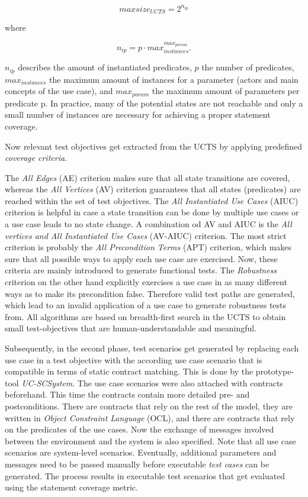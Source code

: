 \begin{equation}
	maxsize_{UCTS} = 2^{n_{ip}}
\end{equation}

where

\begin{equation}
	n_{ip} = p \cdot max_{instances}^{max_{param}}.
\end{equation}

$n_{ip}$ describes the amount of instantiated predicates, $p$ the number of predicates, $max_{instances}$ the maximum amount of instances for a parameter (actors and main concepts of the use case), and $max_{param}$ the maximum amount of parameters per predicate p. In practice, many of the potential states are not reachable and only a small number of instances are necessary for achieving a proper statement coverage. 

Now relevant test objectives get extracted from the UCTS by applying predefined \textit{coverage criteria}. 

The \textit{All Edges} (AE) criterion makes sure that all state transitions are covered, whereas the \textit{All Vertices} (AV) criterion guarantees that all states (predicates) are reached within the set of test objectives.  The \textit{All Instantiated Use Cases} (AIUC) criterion is helpful in case a state transition can be done by multiple use cases or a use case leads to no state change. A combination od AV and AIUC is the \textit{All vertices and All Instantiated Use Cases} (AV-AIUC) criterion. The most strict criterion is probably the \textit{All Precondition Terms} (APT) criterion, which makes sure that all possible ways to apply each use case are exercised. Now, these criteria are mainly introduced to generate functional tests. The \textit{Robustness} criterion on the other hand explicitly exercises a use case in as many different ways as to make its precondition false. Therefore valid test paths are generated, which lead to an invalid application of a use case to generate robustness tests from. All algorithms are based on breadth-first search in the UCTS to obtain small test-objectives that are human-understandable and meaningful. 

\newpage 

Subsequently, in the second phase, test scenarios get generated by replacing each use case in a test objective with the according use case scenario that is compatible in terms of static contract matching. This is done by the prototype-tool \textit{UC-SCSystem}. The use case scenarios were also attached with contracts beforehand. This time the contracts contain more detailed pre- and postconditions. There are contracts that rely on the rest of the model, they are written in \textit{Object Constraint Language} (OCL), and there are contracts that rely on the predicates of the use cases. Now the exchange of messages involved between the environment and the system is also specified. Note that all use case scenarios are system-level scenarios. Eventually, additional parameters and messages need to be passed manually before executable \textit{test cases} can be generated. The process results in executable test scenarios that get evaluated using the statement coverage metric.

